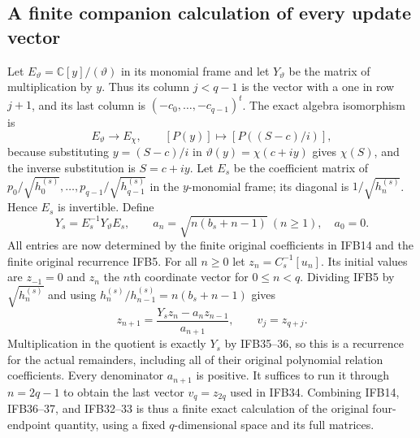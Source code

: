 \documentclass[11pt,a4paper]{article}
\begin{document}
\subsection{A finite companion calculation of every update vector}

Let $E_{\vartheta}=\mathbb C[y]/(\vartheta)$ in its monomial
frame and let $Y_\vartheta$ be the matrix of multiplication by $y$.
Thus its column $j<q-1$ is the vector with a one in row $j+1$,
and its last column is $(-c_0,\ldots,-c_{q-1})^t$.
The exact algebra isomorphism is
\[
 E_{\vartheta}\longrightarrow E_\chi,\qquad
 [P(y)]\longmapsto[P((S-c)/i)],
 \tag{IFB35}
\]
because substituting $y=(S-c)/i$ in
$\vartheta(y)=\chi(c+iy)$ gives $\chi(S)$, and the inverse
substitution is $S=c+iy$. Let $E_s$ be the coefficient matrix of
$p_0/\sqrt{h_0^{(s)}},\ldots,p_{q-1}/\sqrt{h_{q-1}^{(s)}}$
in the $y$-monomial frame; its diagonal is
$1/\sqrt{h_n^{(s)}}$. Hence $E_s$ is invertible. Define
\[
 Y_s=E_s^{-1}Y_\vartheta E_s,\qquad
 a_n=\sqrt{n(b_s+n-1)}\ (n\geq1),\quad a_0=0.
 \tag{IFB36}
\]
All entries are now determined by the finite original coefficients
in IFB14 and the finite original recurrence IFB5. For all $n\geq0$
let $z_n=C_s^{-1}[u_n]$. Its initial values are
$z_{-1}=0$ and $z_n$ the $n$th coordinate vector for $0\leq n<q$.
Dividing IFB5 by $\sqrt{h_n^{(s)}}$ and using
$h_n^{(s)}/h_{n-1}^{(s)}=n(b_s+n-1)$ gives
\[
 \boxed{\displaystyle
 z_{n+1}=\frac{Y_sz_n-a_nz_{n-1}}{a_{n+1}},\qquad
 v_j=z_{q+j}.}
 \tag{IFB37}
\]
Multiplication in the quotient is exactly $Y_s$ by IFB35--36, so
this is a recurrence for the actual remainders, including all of
their original polynomial relation coefficients. Every denominator
$a_{n+1}$ is positive. It suffices to run it through $n=2q-1$ to
obtain the last vector $v_q=z_{2q}$ used in IFB34. Combining
IFB14, IFB36--37, and IFB32--33 is thus a finite exact calculation
of the original four-endpoint quantity, using a fixed $q$-dimensional
space and its full matrices.
\end{document}
